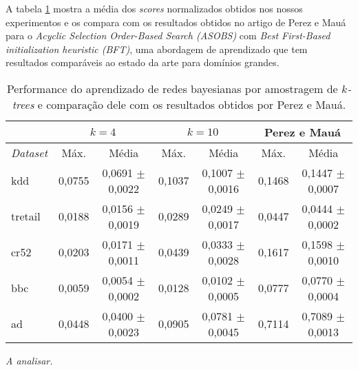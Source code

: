 A tabela \ref{tab:comparacao} mostra a média dos \emph{scores} normalizados obtidos nos nossos experimentos e os compara com os resultados obtidos no artigo de Perez e Mauá \cite{perez} para o \emph{Acyclic Selection Order-Based Search (ASOBS)} com \emph{Best First-Based initialization heuristic (BFT)}, uma abordagem de aprendizado que tem resultados comparáveis ao estado da arte para domínios grandes.

\begin{table}[h]
  \centering

  {\footnotesize
    \begin{tabular}{l c c c c c c} \hline
      & \multicolumn{2}{c}{$k = 4$} & \multicolumn{2}{c}{$k = 10$} & \multicolumn{2}{c}{Perez e Mauá} \\ \hline
      \emph{Dataset} & Máx. & Média & Máx. & Média & Máx. & Média \\ \hline
      kdd & 0,0755 & 0,0691 $\pm$ 0,0022 & 0,1037 & 0,1007 $\pm$ 0,0016 & 0,1468 & 0,1447 $\pm$ 0,0007 \\
      tretail & 0,0188 & 0,0156 $\pm$ 0,0019 & 0,0289 & 0,0249 $\pm$ 0,0017 & 0,0447 & 0,0444 $\pm$ 0,0002 \\
      cr52 & 0,0203 & 0,0171 $\pm$ 0,0011 & 0,0439 & 0,0333 $\pm$ 0,0028 & 0,1617 & 0,1598 $\pm$ 0,0010 \\
      bbc & 0,0059 & 0,0054 $\pm$ 0,0002 & 0,0128 & 0,0102 $\pm$ 0,0005 & 0,0777 & 0,0770 $\pm$ 0,0004 \\
      ad & 0,0448 & 0,0400 $\pm$ 0,0023 & 0,0905 & 0,0781 $\pm$ 0,0045 & 0,7114 & 0,7089 $\pm$ 0,0013 \\ \hline
    \end{tabular}
  }

  \caption{Performance do aprendizado de redes bayesianas por amostragem de \emph{$k$-trees} e comparação dele com os resultados obtidos por Perez e Mauá.}
  \label{tab:comparacao}
\end{table}

\emph{A analisar.} %
